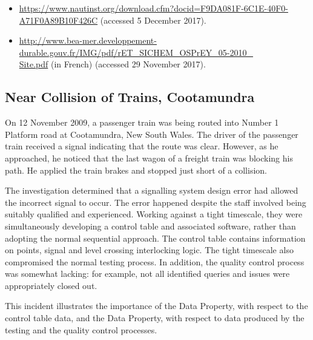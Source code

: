 \begin{samepage}
\begin{itemize}
	\item \raggedright{\href{https://www.nautinst.org/download.cfm?docid=F9DA081F-6C1E-40F0-A71F0A89B10F426C}{https://www.nautinst.org/download.cfm?docid=F9DA081F-6C1E-40F0-A71F0A89B10F426C} (accessed 5 December 2017).}
  \item \raggedright{\href{http://www.bea-mer.developpement-durable.gouv.fr/IMG/pdf/rET_SICHEM_OSPrEY_05-2010_Site.pdf}{http://www.bea-mer.developpement-durable.gouv.fr/IMG/pdf/rET\_SICHEM\_OSPrEY\_05-2010\_\\Site.pdf} (in French) (accessed 29 November 2017).}
\end{itemize}
\end{samepage}


\subsection{Near Collision of Trains, Cootamundra} \label{bkm:incacc:cootamundra}
On 12 November 2009, a passenger train was being routed into Number 1 Platform road at Cootamundra, New South Wales. The driver of the passenger train received a signal indicating that the route was clear. However, as he approached, he noticed that the last wagon of a freight train was blocking his path. He applied the train brakes and stopped just short of a collision.

The investigation determined that a signalling system design error had allowed the incorrect signal to occur. The error happened despite the staff involved being suitably qualified and experienced. Working against a tight timescale, they were simultaneously developing a control table and associated software, rather than adopting the normal sequential approach. The control table contains information on points, signal and level crossing interlocking logic. The tight timescale also compromised the normal testing process. In addition, the quality control process was somewhat lacking: for example, not all identified queries and issues were appropriately closed out.

This incident illustrates the importance of the  Data Property, with respect to the control table data, and the  Data Property, with respect to data produced by the testing and the quality control processes.

